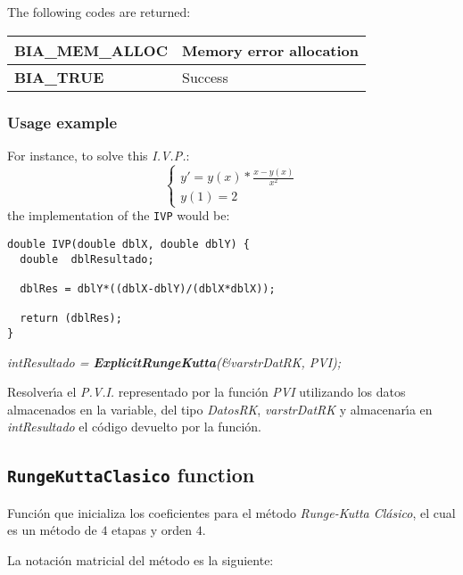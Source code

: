 The following codes are returned:
%
\begin{center}
\begin{tabular}{|l|l|}
\hline
\textbf{BIA\_MEM\_ALLOC} & Memory error allocation \\
\hline
\textbf{BIA\_TRUE} & Success \\
\hline
\end{tabular}
\end{center}

\subsubsection{Usage example}

For instance, to solve this \emph{I.V.P.}:
%
\begin{displaymath}
\left \{ \begin{array}{l}
y' = y(x) * \frac{x-y(x)}{x^2} \\
y(1) = 2
\end{array} \right.
\end{displaymath}
%
the implementation of the \texttt{IVP} would be:
%
\begin{verbatim}
double IVP(double dblX, double dblY) {
  double  dblResultado;

  dblRes = dblY*((dblX-dblY)/(dblX*dblX));

  return (dblRes);
}
\end{verbatim}




\begin{center}
\emph{intResultado = \textbf{ExplicitRungeKutta}(\&varstrDatRK, PVI);}
\end{center}

Resolver\'{\i}a el \emph{P.V.I.} representado por la funci\'on \emph{PVI} 
utilizando los datos almacenados en la variable, del tipo \emph{DatosRK},
\emph{varstrDatRK} y almacenar\'{\i}a en \emph{intResultado} el c\'odigo
devuelto por la funci\'on.

\subsection{\texttt{RungeKuttaClasico} function}

Funci\'on que inicializa los coeficientes para el m\'etodo \emph{Runge-Kutta 
Cl\'asico}, el cual es un m\'etodo de $4$ etapas y orden $4$.\newline

La notaci\'on matricial del m\'etodo es la siguiente:

